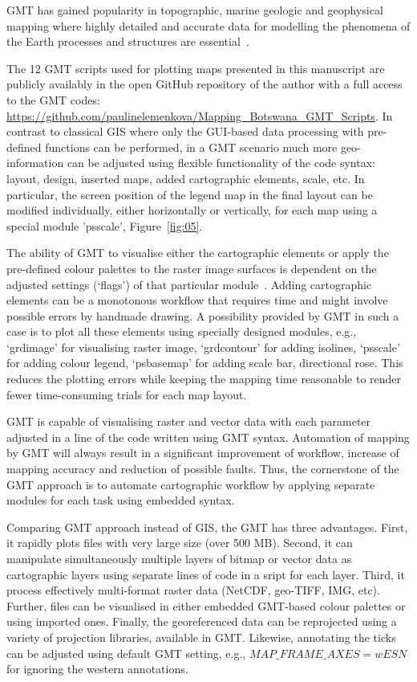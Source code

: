 \documentclass[ijgi,article,accept,pdftex,moreauthors]{Definitions/mdpi}
\begin{document}
GMT has gained popularity in topographic, marine geologic and geophysical mapping where highly detailed and accurate data for modelling the phenomena of the Earth processes and structures are essential~\cite{Virden,Lemenkova202127,Senturk,Lemenkova202017,Lindh202208,Lemenkova202018,Shietal2009}.  

The 12 GMT scripts used for plotting maps presented in this manuscript are publicly availably in the open GitHub repository of the author with a full access to the GMT codes:
 \href{https://github.com/paulinelemenkova/Mapping_Botswana_GMT_Scripts}{https://github.com/paulinelemenkova/Mapping\_Botswana\_GMT\_Scripts}. In contrast to classical GIS where only the GUI-based data processing with pre-defined functions can be performed, in a GMT scenario much more geo-information can be adjusted using flexible functionality of the code syntax: layout, design, inserted maps, added cartographic elements, scale, etc. In particular, the screen position of the legend map in the final layout can be modified individually, either horizontally or vertically, for each map using a special module 'psscale', Figure~\ref{fig:05}. 
 
 The ability of GMT to visualise either the cartographic elements or apply the pre-defined colour palettes to the raster image surfaces is dependent on the adjusted settings (‘flags’) of that particular module~\cite{Lemenkova202213}. Adding cartographic elements can be a monotonous workflow that requires time and might involve possible errors by handmade drawing. A possibility provided by GMT in such a case is to plot all these elements using specially designed modules, e.g., ‘grdimage’ for visualising raster image, ‘grdcontour’ for adding isolines, ‘psscale’ for adding colour legend, ‘psbasemap’ for adding scale bar, directional rose. This reduces the plotting errors while keeping the mapping time reasonable to render fewer time-consuming trials for each map layout.

GMT is capable of visualising raster and vector data with each parameter adjusted in a line of the code written using GMT syntax. Automation of mapping by GMT will always result in a significant improvement of workflow, increase of mapping accuracy and reduction of possible faults. Thus, the cornerstone of the GMT approach is to automate cartographic workflow by applying separate modules for each task using embedded syntax. 	

Comparing GMT approach instead of GIS, the GMT has three advantages. First, it rapidly plots files with very large size (over 500 MB). Second, it can manipulate simultaneously multiple layers of bitmap or vector data as cartographic layers using separate lines of code in a sript for each layer. Third, it process effectively multi-format raster data (NetCDF, geo-TIFF, IMG, etc). Further, files can be visualised in either embedded GMT-based colour palettes or using imported ones. Finally, the georeferenced data can be reprojected using a variety of projection libraries, available in GMT. Likewise, annotating the ticks can be adjusted using default GMT setting, e.g., $MAP\_FRAME\_AXES=wESN$ for ignoring the western annotations.
\end{document}
